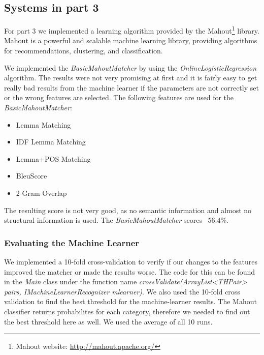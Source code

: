 \subsection{Systems in part 3}
For part 3 we implemented a learning algorithm provided by the Mahout\footnote{Mahout website:
\url{http://mahout.apache.org/}} library. Mahout is a powerful and scalable machine learning library, providing
algorithms for recommendations, clustering, and classification.

We implemented the \textit{BasicMahoutMatcher} by using
the \textit{OnlineLogisticRegression} algorithm. The results were not very promising at first and it is fairly easy to
get really bad results from the machine learner if the parameters are not correctly set or the wrong features are
selected. The following features are used for the \textit{BasicMahoutMatcher}:

\begin{itemize}
    \item Lemma Matching
    \item IDF Lemma Matching
    \item Lemma+POS Matching
    \item BleuScore
    \item 2-Gram Overlap
\end{itemize}

The resulting score is not very good, as no semantic information and almost no structural information is used. The
\textit{BasicMahoutMatcher} scores ~56.4\%.

\subsubsection{Evaluating the Machine Learner}
We implemented a 10-fold cross-validation to verify if our changes to the features improved the matcher or made the
results worse. The code for this can be found in the \textit{Main} class under the function name
\textit{crossValidate(ArrayList<THPair> pairs, IMachineLearnerRecognizer mlearner)}. We also used the 10-fold cross
validation to find the best threshold for the machine-learner results. The Mahout classifier returns probabilites for
each category, therefore we needed to find out the best threshold here as well. We used the average of all 10 runs.


